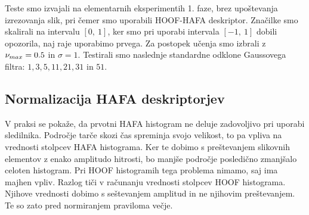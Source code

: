 Teste smo izvajali na elementarnih eksperimentih 1. faze, brez upoštevanja izrezovanja slik, pri čemer smo uporabili HOOF-HAFA deskriptor. Značilke smo skalirali na intervalu $[0,~1]$, ker smo pri uporabi intervala $[-1,~1]$ dobili opozorila, naj raje uporabimo prvega. Za postopek učenja smo izbrali \nurbf z \hbox{$\nu_{max}=\num{0.5}$} in \hbox{$\sigma=1$}. Testirali smo naslednje standardne odklone Gaussovega filtra: $1, 3, 5, 11, 21, 31$ in $51$. 

\subsection{Normalizacija HAFA deskriptorjev}
V praksi se pokaže, da prvotni HAFA histogram ne deluje zadovoljivo pri uporabi sledilnika. Področje tarče skozi čas spreminja svojo velikost, to pa vpliva na vrednosti stolpcev HAFA histograma. Ker te dobimo s preštevanjem slikovnih elementov z enako amplitudo hitrosti, bo manjše področje posledično zmanjšalo celoten histogram. Pri HOOF histogramih tega problema nimamo, saj ima majhen vpliv. Razlog tiči v računanju vrednosti stolpcev HOOF histograma. Njihove vrednosti dobimo s seštevanjem amplitud in ne njihovim preštevanjem. Te so zato pred normiranjem praviloma večje.

